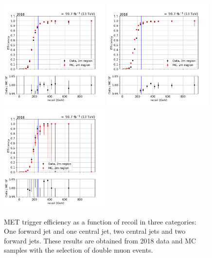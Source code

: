 
\begin{figure}[htp]
    \begin{center}
        \includegraphics[width=0.49\textwidth]{fig/efficiency/trigger/met/recoil/data_mc_comparison_2m_2018_one_jet_forward_one_jet_central.png}
        \includegraphics[width=0.49\textwidth]{fig/efficiency/trigger/met/recoil/data_mc_comparison_2m_2018_two_central_jets.png} \\
        \includegraphics[width=0.49\textwidth]{fig/efficiency/trigger/met/recoil/data_mc_comparison_2m_2018_two_forward_jets.png}
    \end{center}
    \caption{MET trigger efficiency as a function of recoil in three categories: One forward jet and one central jet, two central jets and
            two forward jets. These results are obtained from 2018 data and MC samples with the selection of double muon events.} 
    \label{fig:eff_recoil_2018_2m}      
\end{figure}

